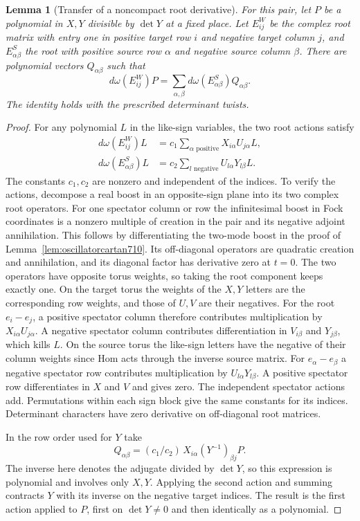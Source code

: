 \documentclass[a4paper,11pt]{article}
\newtheorem{lemma}[proposition]{Lemma}
\theoremstyle{definition}
\theoremstyle{remark}
\numberwithin{equation}{section}
\begin{document}
\begin{lemma}[Transfer of a noncompact root derivative]
\leavevmode\label{lem:roottransfer817}
For this pair, let \(P\) be a polynomial in \(X,Y\) divisible
by \(\det Y\) at a fixed place. Let \(E^{W}_{ij}\) be the
complex root matrix with entry one in positive target row \(i\)
and negative target column \(j\), and \(E^S_{\alpha\beta}\)
the root with positive source row \(\alpha\) and negative source
column \(\beta\). There are polynomial vectors \(Q_{\alpha\beta}\)
such that
\[
     d\omega(E^{W}_{ij})P
       =\sum_{\alpha,\beta}d\omega(E^S_{\alpha\beta})
                                   Q_{\alpha\beta}.
\]
The identity holds with the prescribed determinant twists.
\end{lemma}
\begin{proof}
For any polynomial \(L\) in the like-sign variables,
the two root actions satisfy
\[
 \begin{aligned}
 d\omega(E^W_{ij})L
   &=c_1\sum_{\alpha\text{ positive}}X_{i\alpha}U_{j\alpha}L,\\
 d\omega(E^S_{\alpha\beta})L
   &=c_2\sum_{l\text{ negative}}U_{l\alpha}Y_{l\beta}L .
 \end{aligned}
\]
The constants \(c_1,c_2\) are nonzero and independent of the
indices. To verify the actions, decompose a real boost in an
opposite-sign plane into its two complex root operators. For
one spectator column or row the infinitesimal boost in Fock
coordinates is a nonzero multiple of creation in the pair
and its negative adjoint annihilation. This follows by
differentiating the two-mode boost in the proof of
Lemma~\ref{lem:oscillatorcartan710}. Its off-diagonal
operators are quadratic creation and annihilation,
and its diagonal factor has derivative zero at \(t=0\).
The two operators have opposite torus weights, so taking
the root component keeps exactly one. On the target torus
the weights of the \(X,Y\) letters are the corresponding
row weights, and those of \(U,V\) are their negatives.
For the root \(e_i-e_j\), a positive spectator column
therefore contributes multiplication by \(X_{i\alpha}U_{j\alpha}\).
A negative spectator column contributes differentiation
in \(V_{i\beta}\) and \(Y_{j\beta}\), which kills \(L\).
On the source torus the like-sign letters have the negative
of their column weights since Hom acts through the inverse
source matrix. For \(e_\alpha-e_\beta\) a negative spectator
row contributes multiplication by \(U_{l\alpha}Y_{l\beta}\).
A positive spectator row differentiates in \(X\) and \(V\)
and gives zero. The independent spectator actions add.
Permutations within each sign block give the same constants
for its indices. Determinant characters have zero derivative
on off-diagonal root matrices.

In the row order used for \(Y\) take
\[
        Q_{\alpha\beta}=(c_1/c_2)\,
              X_{i\alpha}(Y^{-1})_{\beta j}P .
\]
The inverse here denotes the adjugate divided by \(\det Y\),
so this expression is polynomial and involves only \(X,Y\).
Applying the second action and summing contracts \(Y\) with
its inverse on the negative target indices. The result is
the first action applied to \(P\), first on \(\det Y\ne0\)
and then identically as a polynomial.
\end{proof}
\end{document}
